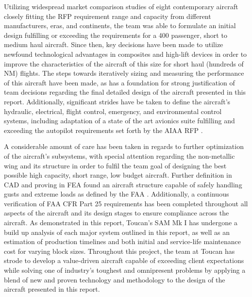 Utilizing widespread market comparison studies of eight contemporary aircraft closely fitting the RFP \cite{RFP} requirement range and capacity from different manufacturers, eras, and continents, the team was able to formulate an initial design fulfilling or exceeding the requirements for a 400 passenger, short to medium haul aircraft. Since then, key decisions have been made to utilize newfound technological advantages in composites and high-lift devices in order to improve the characteristics of the aircraft of this size for short haul (hundreds of NM) flights.  The steps towards iteratively sizing and measuring the performance of this aircraft have been made, as has a foundation for strong justification of team decisions regarding the final detailed design of the aircraft presented in this report.  Additionally, significant strides have be taken to define the aircraft's hydraulic, electrical, flight control, emergency, and environmental control systems, including adaptation of a state of the art avionics suite fulfilling and exceeding the autopilot requirements set forth by the AIAA RFP \cite{RFP}.

A considerable amount of care has been taken in regards to further optimization of the aircraft's subsystems, with special attention regarding the non-metallic wing and its structure in order to fulfil the team goal of designing the best possible high capacity, short range, low budget aircraft. Further definition in CAD and proving in FEA found an aircraft structure capable of safely handling gusts and extreme loads as defined by the FAA \cite{cfr}.  Additionally, a continuous verification of FAA CFR Part 25 \cite{cfr} requirements has been completed throughout all aspects of the aircraft and its design stages to ensure compliance across the aircraft.  As demonstrated in this report, Toucan's SAM Mk I has undergone a build up analysis of each major system outlined in this report, as well as an estimation of production timelines and both initial and service-life maintenance cost for varying block sizes.  Throughout this project, the team at Toucan has strode to develop a value-driven aircraft capable of exceeding client expectations while solving one of industry's toughest and omnipresent problems by applying a blend of new and proven technology and methodology to the design of the aircraft presented in this report.  

